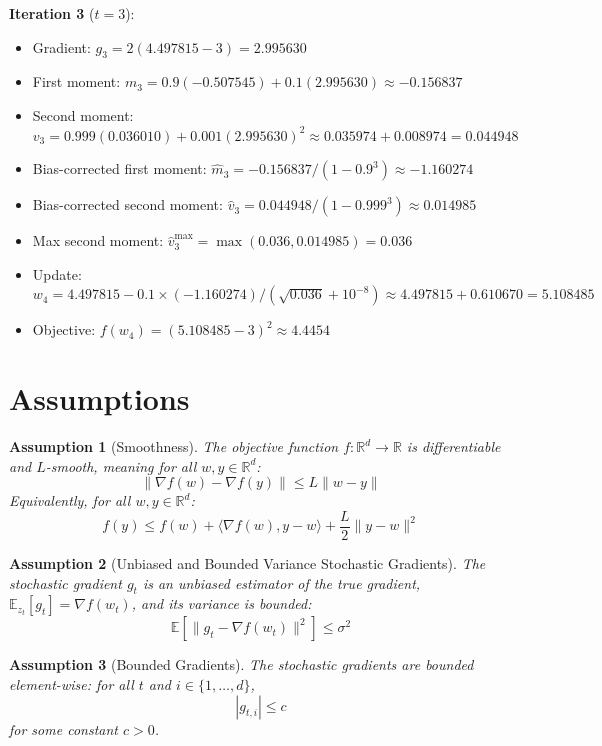 \documentclass{article}
\newtheorem{assumption}{Assumption}
\begin{document}
\textbf{Iteration 3} ($t=3$):
\begin{itemize}
\item Gradient: $g_3 = 2(4.497815 - 3) = 2.995630$
\item First moment: $m_3 = 0.9(-0.507545) + 0.1(2.995630) \approx -0.156837$
\item Second moment: $v_3 = 0.999(0.036010) + 0.001(2.995630)^2 \approx 0.035974 + 0.008974 = 0.044948$
\item Bias-corrected first moment: $\hat{m}_3 = -0.156837 / (1 - 0.9^3) \approx -1.160274$
\item Bias-corrected second moment: $\hat{v}_3 = 0.044948 / (1 - 0.999^3) \approx 0.014985$
\item Max second moment: $\hat{v}_3^{\max} = \max(0.036, 0.014985) = 0.036$
\item Update: $w_4 = 4.497815 - 0.1 \times (-1.160274) / (\sqrt{0.036} + 10^{-8}) \approx 4.497815 + 0.610670 = 5.108485$
\item Objective: $f(w_4) = (5.108485 - 3)^2 \approx 4.4454$
\end{itemize}

\newpage
\section*{Assumptions}

\begin{assumption}[Smoothness]
The objective function $f: \mathbb{R}^d \rightarrow \mathbb{R}$ is differentiable and $L$-smooth, meaning for all $w, y \in \mathbb{R}^d$:
$$ \|\nabla f(w) - \nabla f(y)\| \leq L \|w - y\| $$
Equivalently, for all $w, y \in \mathbb{R}^d$:
$$ f(y) \leq f(w) + \langle \nabla f(w), y - w \rangle + \frac{L}{2} \|y - w\|^2 $$
\end{assumption}

\begin{assumption}[Unbiased and Bounded Variance Stochastic Gradients]
The stochastic gradient $g_t$ is an unbiased estimator of the true gradient, $\mathbb{E}_{z_t}[g_t] = \nabla f(w_t)$, and its variance is bounded:
$$ \mathbb{E}[\|g_t - \nabla f(w_t)\|^2] \leq \sigma^2 $$
\end{assumption}

\begin{assumption}[Bounded Gradients]
The stochastic gradients are bounded element-wise: for all $t$ and $i \in \{1, \dots, d\}$,
$$ |g_{t,i}| \leq c $$
for some constant $c > 0$.
\end{assumption}
\end{document}
